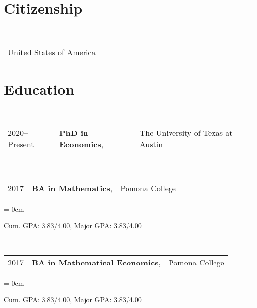 \documentclass[a4paper, 11pt]{article}
\begin{document}
  \maketitle
  \thispagestyle{firststyle}
    
  \section{Citizenship}
  ~\begin{tabular}{l}
    United States of America\\
  \end{tabular}
      
  \section{Education}
  ~\begin{tabular}{lll}
    2020--Present & \textbf{PhD in Economics}, & The University of Texas at Austin\\
    \vspace*{-0.50em}
  \end{tabular}

  ~\begin{tabular}{lll}
    2017 & \textbf{BA in Mathematics}, & Pomona College\\
  \end{tabular}
  \begin{compactitem}\parskip = 0cm
    \item Cum. GPA: 3.83/4.00, Major GPA: 3.83/4.00\\
  \end{compactitem}
  \vspace*{1em}
      
  ~\begin{tabular}{lll}
    2017 & \textbf{BA in Mathematical Economics}, & Pomona College\\
  \end{tabular}
  \begin{compactitem}\parskip = 0cm
    \item Cum. GPA: 3.83/4.00, Major GPA: 3.83/4.00\\
  \end{compactitem}
      
\end{document}
